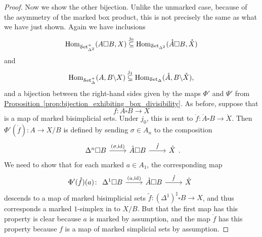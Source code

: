 \documentclass[main.tex]{subfiles}
\begin{document}
\begin{proof}
  Now we show the other bijection. Unlike the unmarked case, because of the asymmetry of the marked box product, this is not precisely the same as what we have just shown. Again we have inclusions
  \begin{equation*}
    \mathrm{Hom}_{\mathcal{S}\mathrm{et}_{\Delta^{2}}^{+}}(A \square B, X) \overset{j_{0}}{\subseteq} \mathrm{Hom}_{\mathcal{S}\mathrm{et}_{\Delta^{2}}}(\mathring{A} \square B, \mathring{X})
  \end{equation*}
  and
  \begin{equation*}
    \mathrm{Hom}_{\mathcal{S}\mathrm{et}_{\Delta}^{+}}(A, B \backslash X) \overset{j_{1}}{\subseteq} \mathrm{Hom}_{\mathcal{S}\mathrm{et}_{\Delta}}(\mathring{A}, B \backslash \mathring{X}),
  \end{equation*}
  and a bijection between the right-hand sides given by the maps $\Phi'$ and $\Psi'$ from \hyperref[prop:bijection_exhibiting_box_divisibility]{Proposition~\ref*{prop:bijection_exhibiting_box_divisibility}}. As before, suppose that
  \begin{equation*}
    f\colon A \square B \to X
  \end{equation*}
  is a map of marked bisimplicial sets. Under $j_{0}$, this is sent to $\mathring{f}\colon \mathring{A} \square B \to \mathring{X}$. Then $\Phi'(\mathring{f})\colon A \to X / B$ is defined by sending $\sigma \in A_{n}$ to the composition
  \begin{equation*}
    \begin{tikzcd}
      \Delta^{n} \square B
      \arrow[r, "{(\sigma, \id)}"]
      & \mathring{A} \square B
      \arrow[r, "\mathring{f}"]
      & \mathring{X}
    \end{tikzcd}.
  \end{equation*}
  We need to show that for each marked $a \in A_{1}$, the corresponding map
  \begin{equation*}
    \Phi'(\mathring{f})(a)\colon 
    \begin{tikzcd}
      \Delta^{1} \square B
      \arrow[r, "{(a, \id)}"]
      & \mathring{A} \square B
      \arrow[r, "\mathring{f}"]
      & \mathring{X}
    \end{tikzcd}
  \end{equation*}
  descends to a map of marked bisimplicial sets $\tilde{f}\colon (\Delta^{1})^{\sharp} \square B \to X$, and thus corresponds a marked $1$-simplex in to $X / B$. But that the first map has this property is clear because $a$ is marked by assumption, and the map $\mathring{f}$ has this property because $f$ is a map of marked simplicial sets by assumption.


\end{proof}
\end{document}
